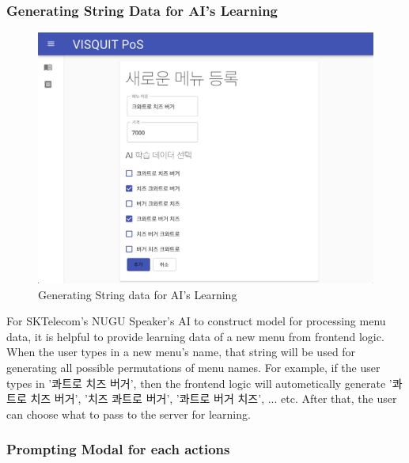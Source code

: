 \documentclass[conference,compsoc]{IEEEtran}
\begin{document}
\subsubsection{Generating String Data for AI's Learning}

\begin{figure}[ht!]
  \includegraphics[width=\linewidth]{figures/frontend/04-newmenu-ai.png}
  \caption{Generating String data for AI's Learning}
  \label{fig:04-newmenu-ai}
\end{figure}

For SKTelecom's NUGU Speaker's AI to construct model for processing menu data, it is helpful to provide learning data of a new menu from frontend logic. When the user types in a new menu's name, that string will be used for generating all possible permutations of menu names. For example, if the user types in '콰트로 치즈 버거', then the frontend logic will autometically generate '콰트로 치즈 버거', '치즈 콰트로 버거', '콰트로 버거 치즈', ... etc. After that, the user can choose what to pass to the server for learning.

\subsubsection{Prompting Modal for each actions}
\end{document}
